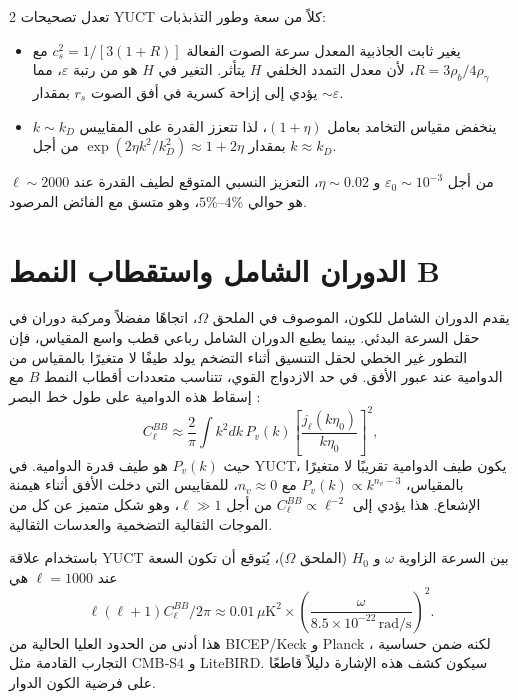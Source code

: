 \documentclass[11pt,a4paper]{article}
\begin{document}
\begin{multicols}{2}
		تعدل تصحيحات YUCT كلاً من سعة وطور التذبذبات:
		\begin{itemize}
			\item يغير ثابت الجاذبية المعدل سرعة الصوت الفعالة $c_s^2 = 1/[3(1+R)]$ مع $R = 3\rho_b/4\rho_\gamma$، لأن معدل التمدد الخلفي $H$ يتأثر. التغير في $H$ هو من رتبة $\varepsilon$، مما يؤدي إلى إزاحة كسرية في أفق الصوت $r_s$ بمقدار $\sim \varepsilon$.
			\item ينخفض مقياس التخامد بعامل $(1+\eta)$، لذا تتعزز القدرة على المقاييس $k \sim k_D$ بمقدار $\exp(2\eta k^2/k_D^2) \approx 1 + 2\eta$ من أجل $k \approx k_D$.
		\end{itemize}
		من أجل $\varepsilon_0 \sim 10^{-3}$ و $\eta \sim 0.02$، التعزيز النسبي المتوقع لطيف القدرة عند $\ell \sim 2000$ هو حوالي $4\%$--$5\%$، وهو متسق مع الفائض المرصود.
		
		\section{الدوران الشامل واستقطاب النمط B}
		
		يقدم الدوران الشامل للكون، الموصوف في الملحق $\Omega$، اتجاهًا مفضلاً ومركبة دوران في حقل السرعة البدئي. بينما يطبع الدوران الشامل رباعي قطب واسع المقياس، فإن التطور غير الخطي لحقل التنسيق أثناء التضخم يولد طيفًا لا متغيرًا بالمقياس من الدوامية عند عبور الأفق. في حد الازدواج القوي، تتناسب متعددات أقطاب النمط $B$ مع إسقاط هذه الدوامية على طول خط البصر \cite{Cooray2005}:
		\begin{equation}
			C_\ell^{BB} \approx \frac{2}{\pi} \int k^2 dk \, P_v(k) \left[ \frac{j_\ell(k\eta_0)}{k\eta_0} \right]^2,
		\end{equation}
		حيث $P_v(k)$ هو طيف قدرة الدوامية. في YUCT، يكون طيف الدوامية تقريبًا لا متغيرًا بالمقياس، $P_v(k) \propto k^{n_v-3}$ مع $n_v \approx 0$، للمقاييس التي دخلت الأفق أثناء هيمنة الإشعاع. هذا يؤدي إلى $C_\ell^{BB} \propto \ell^{-2}$ من أجل $\ell \gg 1$، وهو شكل متميز عن كل من الموجات الثقالية التضخمية والعدسات الثقالية.
		
		باستخدام علاقة YUCT بين السرعة الزاوية $\omega$ و $H_0$ (الملحق $\Omega$)، يُتوقع أن تكون السعة عند $\ell=1000$ هي
		\begin{equation}
			\ell(\ell+1)C_\ell^{BB}/2\pi \approx 0.01\,\mu\text{K}^2 \times \left(\frac{\omega}{8.5\times10^{-22}\,\text{rad/s}}\right)^2.
			\label{eq:BB_amplitude}
		\end{equation}
		هذا أدنى من الحدود العليا الحالية من BICEP/Keck و Planck \cite{BICEP2021}، لكنه ضمن حساسية التجارب القادمة مثل CMB‑S4 و LiteBIRD. سيكون كشف هذه الإشارة دليلاً قاطعًا على فرضية الكون الدوار.
		

\end{multicols}
\end{document}
